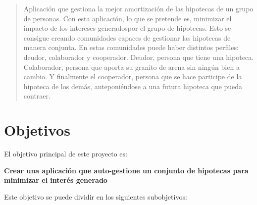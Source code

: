 \documentclass[10pt]{article}
\begin{document}
\title{}
\author{Diego Pardilla}
\date{\today}


\maketitle

\begin{abstract}
Aplicación que gestiona la mejor amortización de las hipotecas de un grupo de personas. Con esta aplicación, lo que se pretende es, minimizar el impacto de los intereses generadospor el grupo de hipotecas. Esto se consigue creando comunidades capaces de gestionar las hipotecas de manera conjunta. En estas comunidades puede haber distintos perfiles: deudor, colaborador y cooperador. Deudor, persona que tiene una hipoteca. Colaborador, persona que aporta su granito de arena sin ningún bien a cambio. Y finalmente el cooperador, persona que se hace participe de la hipoteca de los demás, anteponiéndose a una futura hipoteca que pueda contraer.
\end{abstract}

\section{Objetivos}

El objetivo principal de este proyecto es:

\begin{center}
\bf{Crear una aplicación que auto-gestione un conjunto de hipotecas para minimizar el interés generado}
\end{center}

Este objetivo se puede dividir en los siguientes subobjetivos:
\end{document}
